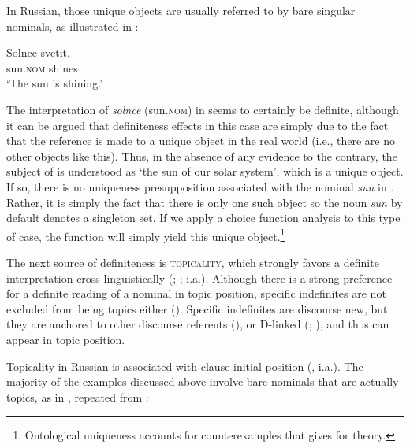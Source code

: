 \documentclass[output=paper,
colorlinks,
citecolor=brown,
newtxmath
]{langscibook}
\begin{document}
In Russian, those unique objects are usually referred to by bare singular nominals, as illustrated in :

\ea \label{ex:31}
\gll	Solnce		svetit.\\
		sun.\textsc{nom}		shines\\
\glt `The sun is shining.'
\z


\noindent The interpretation of \textit{solnce} (sun.\textsc{nom}) in  seems to certainly be definite, although it can be argued that definiteness effects in this case are simply due to the fact that the reference is made to a unique object in the real world (i.e., there are no other objects like this). Thus, in the absence of any evidence to the contrary, the subject of  is understood as `the sun of our solar system', which is a unique object. If so, there is no uniqueness presupposition associated with the nominal \textit{sun} in . Rather, it is simply the fact that there is only one such object so the noun \textit{sun} by default denotes a singleton set. If we apply a choice function analysis to this type of case, the function will simply yield this unique object.\footnote{Ontological uniqueness accounts for counterexamples that \citet{Dayal2017} gives for  theory.}

The next source of definiteness is \textsc{topicality}, which strongly favors a definite interpretation cross-linguistically (\citealt{Reinhart1981}; \citealt{Erteschik-Shir2007}; i.a.). Although there is a strong preference for a definite reading of a nominal in topic position, specific indefinites are not excluded from being topics either (\citealt{Reinhart1981}). Specific indefinites are discourse new, but they are anchored to other discourse referents (\citealt{Heusinger2002}), or D-linked (\citealt{Pesetsky1987}; \citealt{Dyakonova2009}), and thus can appear in topic position.


Topicality in Russian is associated with clause-initial position (\citealt{Geist2010, Jasinskaja2016}, i.a.). The majority of the examples discussed above involve bare nominals that are actually topics, as in , repeated from :
\end{document}
